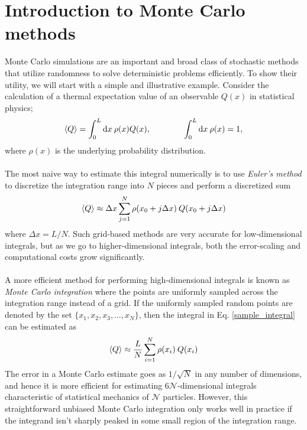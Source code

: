 \documentclass[../journal_main.tex]{subfiles}
\begin{document}
\section{Introduction to Monte Carlo methods}
Monte Carlo simulations are an important and broad class of stochastic methods that utilize randomness to solve deterministic problems efficiently. To show their utility, we will start with a simple and illustrative example. Consider the calculation of a thermal expectation value of an observable $Q(x)$ in statistical physics;
\begin{equation}
    \expval{Q} = \int_0^L \dd x \: \rho(x) Q(x), \qquad \qquad \int_0^L \dd x \: \rho(x) = 1,
    \label{sample_integral}
\end{equation} 
where $\rho(x)$ is the underlying probability distribution.~\\~\\
The most naive way to estimate this integral numerically is to use \textit{Euler's method}  to discretize the integration range into $N$ pieces and perform a discretized sum
\begin{equation}
    \expval{Q} \approx \Delta x \sum_{j=1}^N \rho(x_0 + j \Delta x) \: Q(x_0 + j\Delta x)
\end{equation} 
where $\Delta x = L/N$. Such grid-based methods are very accurate for low-dimensional integrals, but as we go to higher-dimensional integrals, both the error-scaling and computational costs grow significantly.~\\~\\
A more efficient method for performing high-dimensional integrals is known as \textit{Monte Carlo integration} where the points are uniformly sampled across the integration range instead of a grid. If the uniformly sampled random points are denoted by the set $\{x_1, x_2, x_3, \ldots, x_N \}$, then the integral in Eq. \eqref{sample_integral} can be estimated as 
\begin{equation}
    \expval{Q} \approx \frac{L}{N} \sum_{i=1}^N \rho(x_i) \: Q(x_i)
\end{equation} 
The error in a Monte Carlo estimate goes as $1/\sqrt{N}$ in any number of dimensions, and hence it is more efficient for estimating $6 \mathcal{N}$-dimensional integrals characteristic of statistical mechanics of $\mathcal{N}$ particles. However, this straightforward unbiased Monte Carlo integration only works well in practice if the integrand isn't sharply peaked in some small region of the integration range.
\end{document}
